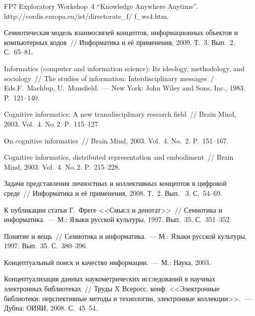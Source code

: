 \begin{multicols}{2}
{\small\frenchspacing
{%
\begin{thebibliography}{99}    
     FP7 Exploratory Workshop~4 ``Knowledge Anywhere Anytime''. {\sf 
http://cordis.europa.eu/ist/directorate\_f/ f\_ws4.htm}.
     
     Семиотическая модель взаимосвязей концептов, информационных объектов и 
компьютерных кодов~// Информатика и её применения, 2009. Т.~3. Вып.~2. С.~65--81.
     
     Informatics (computer and information science): Its ideology, methodology, and sociology~//  
The studies of information: Interdisciplinary messages~/ Eds.F.~Machlup, U.~Mansfield.~--- 
New York: John Wiley and Sons, Inc., 1983. P.~121--140.
     
     Cognitive informatics: A new transdisciplinary research field~// Brain Mind, 2003. 
Vol.~4. No.\,2. P.~115--127.
     
     On cognitive informatics~// Brain Mind, 2003. Vol.~4. No.~2. P.~151--167.
     
     Cognitive informatics, distributed representation and embodiment~// Brain Mind, 2003. 
Vol.~4. No.\,2. P.~215--228.
     
     Задачи представления личностных и коллективных концептов в цифровой среде~// 
Информатика и её применения, 2008. Т.~2. Вып. ~3. С.~54--69.
     
     К публикации статьи Г.~Фреге <<Смысл и денотат>>~// Семиотика и информатика.~--- 
М.: Языки русской культуры, 1997. Вып.~35. С.~351--352.
     
     Понятие и вещь~// Семиотика и информатика.~--- М.: Языки русской культуры, 1997. 
Вып.~35. С.~380--396.
     
     Концептуальный поиск и качество информации.~--- М.: Наука, 2003.
     
     Концептуализация данных науко\-мет\-рических исследований в научных электронных 
биб\-ли\-о\-те\-ках~// Труды X Всеросс. конф. <<Электронные библиотеки: 
перспективные методы и технологии, электронные коллекции>>.~--- Дубна: \mbox{ОИЯИ}, 2008. 
С.~45--54.
     

\end{thebibliography}}}
\end{multicols}
